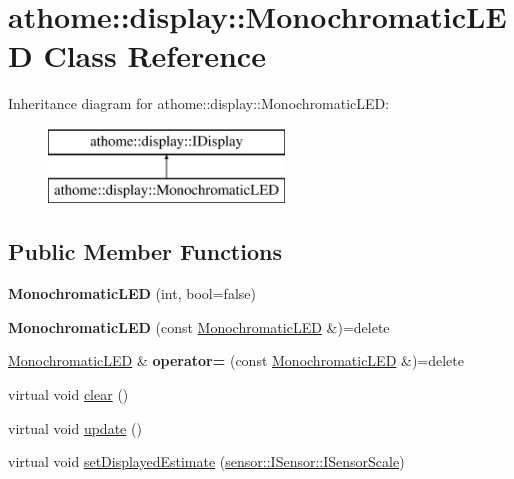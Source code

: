 \hypertarget{classathome_1_1display_1_1_monochromatic_l_e_d}{}\section{athome\+:\+:display\+:\+:Monochromatic\+L\+ED Class Reference}
\label{classathome_1_1display_1_1_monochromatic_l_e_d}
Inheritance diagram for athome\+:\+:display\+:\+:Monochromatic\+L\+ED\+:\begin{figure}[H]
\begin{center}
\leavevmode
\includegraphics[height=2.000000cm]{classathome_1_1display_1_1_monochromatic_l_e_d}
\end{center}
\end{figure}
\subsection*{Public Member Functions}
\begin{DoxyCompactItemize}
\item 
\mbox{\label{classathome_1_1display_1_1_monochromatic_l_e_d_a39e97eaa9f1cbad0288db45f4c94d834}} 
{\bfseries Monochromatic\+L\+ED} (int, bool=false)
\item 
\mbox{\label{classathome_1_1display_1_1_monochromatic_l_e_d_aaafb0861e538c07e1b55d622cda8859a}} 
{\bfseries Monochromatic\+L\+ED} (const \mbox{\hyperlink{classathome_1_1display_1_1_monochromatic_l_e_d}{Monochromatic\+L\+ED}} \&)=delete
\item 
\mbox{\label{classathome_1_1display_1_1_monochromatic_l_e_d_a9b204c11983e469ed8c111689a5d318e}} 
\mbox{\hyperlink{classathome_1_1display_1_1_monochromatic_l_e_d}{Monochromatic\+L\+ED}} \& {\bfseries operator=} (const \mbox{\hyperlink{classathome_1_1display_1_1_monochromatic_l_e_d}{Monochromatic\+L\+ED}} \&)=delete
\item 
virtual void \mbox{\hyperlink{classathome_1_1display_1_1_monochromatic_l_e_d_a81a1470c33e639e916f014e5adbe8707}{clear}} ()
\item 
virtual void \mbox{\hyperlink{classathome_1_1display_1_1_monochromatic_l_e_d_aef6a651fdbb24ebb1d0887c1b3e5133d}{update}} ()
\item 
virtual void \mbox{\hyperlink{classathome_1_1display_1_1_monochromatic_l_e_d_a67a39b7d73305a98fc25705dcc5f3cd0}{set\+Displayed\+Estimate}} (\mbox{\hyperlink{classathome_1_1sensor_1_1_i_sensor_aa70bc27a4c17c86caf96cca776541ddf}{sensor\+::\+I\+Sensor\+::\+I\+Sensor\+Scale}})
\end{DoxyCompactItemize}


